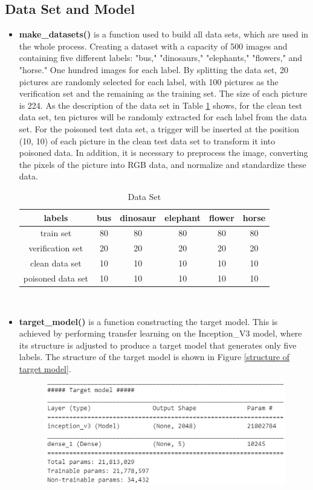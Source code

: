 \documentclass[english,version-2022-01]{uzl-thesis}
\begin{document}
\subsection{Data Set and Model}
\begin{itemize}
    \item \textbf{make\_datasets()} is a function used to build all data sets, which are used in the whole process. Creating a dataset with a capacity of 500 images and containing five different labels: "bus," "dinosaurs," "elephants," "flowers," and "horse." One hundred images for each label. By splitting the data set, 20 pictures are randomly selected for each label, with 100 pictures as the verification set and the remaining as the training set. The size of each picture is 224. As the description of the data set in Table \ref{data set} shows, for the clean test data set, ten pictures will be randomly extracted for each label from the data set. For the poisoned test data set, a trigger will be inserted at the position (10, 10) of each picture in the clean test data set to transform it into poisoned data. In addition, it is necessary to preprocess the image, converting the pixels of the picture into RGB data, and normalize and standardize these data.
    \begin{table}[htbp]
    \centering
    \caption{Data Set}
    \begin{tabular}{|c|c|c|c|c|c|}
    \hline labels & bus & dinosaur & elephant & flower & horse \\
    \hline train set & 80 & 80 & 80 & 80 & 80\\
    \hline verification set & 20 & 20 & 20 & 20 & 20\\
    \hline clean data set & 10 & 10 & 10 & 10 & 10\\
    \hline poisoned data set & 10 & 10 & 10 & 10 & 10\\
    \hline
    \end{tabular}\\
    \label{data set}
    \end{table}
    \item \textbf{target\_model()} is a function constructing the target model. This is achieved by performing transfer learning on the Inception\_V3 model, where its structure is adjusted to produce a target model that generates only five labels. The structure of the target model is shown in Figure \ref{structure of target model}.
    \begin{figure}[htpb]
    \centering
    \includegraphics[width=0.65\linewidth]{pic/TargetModel_anp.png}

\end{figure}
\end{itemize}
\end{document}
